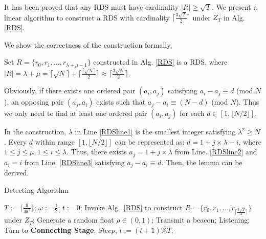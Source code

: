 It has been proved that any RDS must have cardinality $|R| \geq \sqrt{T}$\cite{luk1997two}.
We present a linear algorithm to construct a RDS with 
cardinality $\lceil \frac{3\sqrt{T}}{2}  \rceil$ under $Z_T$ in Alg. \ref{RDS}.

We show the correctness of the construction formally.
\begin{lemma}
\label{RDS1}
Set $R = \{r_0, r_1, ..., r_{\lambda + \mu - 1}\}$ constructed in Alg. \ref{RDS} is a RDS,
where $|R| = \lambda + \mu = \lceil \sqrt{N}  \rceil + \lceil \frac{\lceil \sqrt{N} \rceil}{2} \rceil
\approx \lceil \frac{3\sqrt{N}}{2}  \rceil$.
\end{lemma}
\begin{IEEEproof}
Obviously, if there exists one ordered pair $(a_i,a_j)$ satisfying  $a_i - a_j \equiv d$ (mod $N$),
an opposing pair $(a_j,a_i)$ exists such that
$a_j - a_i \equiv (N-d)$ (mod $N$). Thus we only need to find
at least one ordered pair $(a_i,a_j)$ for each $d \in [1, \lfloor N/2 \rfloor]$.

In the construction, $\lambda$ in Line \ref{RDSline1} is the smallest integer satisfying
$\lambda^2 \geq N$. Every $d$ within range $[1, \lfloor N/2 \rfloor]$
can be represented as: $ d = 1 + j \times \lambda - i$, where $1 \leq j \leq \mu,
1 \leq i \leq \lambda$. Thus, there exists $a_j = 1 + j \times \lambda$
from Line. \ref{RDSline2} and $a_i = i$ from Line. \ref{RDSline3}
satisfying  $a_j - a_i \equiv d$. Then, the lemma can be derived.
\end{IEEEproof}

\begin{algorithm}[!h]
    \caption{Detecting Algorithm}
    \label{DA}
    \begin{algorithmic}[1]
    \STATE $T := \lceil \frac{9}{4\theta^{2}} \rceil$; $\omega :=\frac{1}{2}$; $t := 0$;
    \STATE Invoke Alg.~\ref{RDS} to construct $R = \{r_0, r_1, ...,r_{\lceil 
    \frac{3\sqrt{T}}{2}  \rceil}\}$ under $Z_T$;
                \STATE Generate a random float $\rho \in (0,1)$;
                \IF{$\rho < \omega$}
                    \STATE Transmit a beacon;
                \ELSE
                    \STATE Listening;
                        \STATE Turn to \textbf{Connecting Stage};
                    \ENDIF
                \ENDIF
        \ELSE
                \STATE $Sleep$;
        \ENDIF
        \STATE $t := (t + 1) \% T$;
    \ENDWHILE
    \end{algorithmic}
\end{algorithm}


